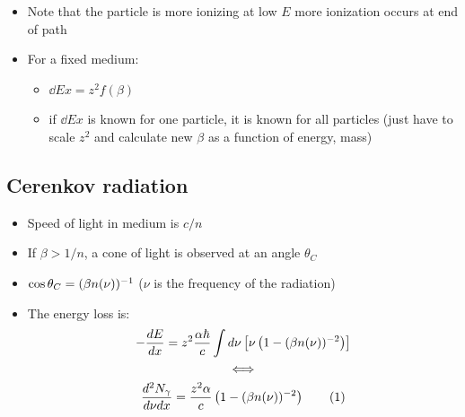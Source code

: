 \begin{itemize}
\begin{itemize}
\begin{center}
    \end{center}
    \item Note that the particle is more ionizing at low $E$ \thus more ionization occurs at end of path
    \item For a fixed medium:
    \begin{itemize}
      \item $\dd{E}{x} = z^2 f(\beta)$
      \item \thus if $\dd{E}{x}$ is known for one particle, it is known for all particles (just have to scale $z^2$ and calculate new $\beta$ as a function of energy, mass)
    \end{itemize}
  \end{itemize}
\end{itemize}

\subsection{Cerenkov radiation}
\begin{itemize}
  \item Speed of light in medium is $c/n$
  \item If $\beta>1/n$, a cone of light is observed at an angle $\theta_C$
  \item $\cos\theta_C = (\beta n(\nu))^{-1}$ ($\nu$ is the frequency of the radiation)
  \item The energy loss is:
  \begin{gather*}
    - \dd{E}{x} = z^2 \frac{\alpha \hbar}{c} \int d\nu \left[\nu \left(1-(\beta n(\nu))^{-2}\right) \right]\\
    \Longleftrightarrow \\
    \frac{d^2N_\gamma}{d\nu dx} = \frac{z^2\alpha}{c}\left(1-(\beta n(\nu))^{-2}\right) \numberthis
  \end{gather*}
\end{itemize}

